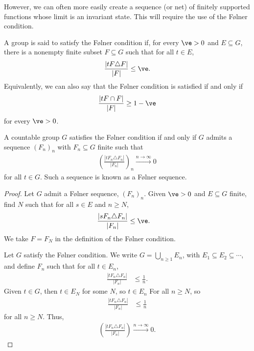 However, we can often more easily create a sequence (or net) of finitely supported functions whose limit is an invariant state. This will require the use of the Følner condition.
\begin{definition}\label{def:folner_condition}
  A group is said to satisfy the {Følner condition} if, for every $\ve > 0$ and $E\subseteq G$, there is a nonempty finite subset $F\subseteq G$ such that for all $t\in E$,
  \begin{align*}
    \frac{\left\vert tF\triangle F \right\vert}{\left\vert F \right\vert}\leq \ve.
  \end{align*}
  Equivalently, we can also say that the Følner condition is satisfied if and only if
  \begin{align*}
    \frac{\left\vert tF\cap F \right\vert}{\left\vert F \right\vert} \geq 1 - \ve
  \end{align*}
  for every $\ve > 0$.
\end{definition}
\begin{lemma}\label{lemma:folner_sequences}
  A countable group $G$ satisfies the Følner condition if and only if $G$ admits a sequence $\left(F_n\right)_n$ with $F_n\subseteq G$ finite such that
  \begin{align*}
    \left(\frac{\left\vert tF_n\triangle F_n \right\vert}{\left\vert F_n \right\vert}\right)_n \xrightarrow{n\rightarrow \infty}0
  \end{align*}
  for all $t\in G$. Such a sequence is known as a Følner sequence.
\end{lemma}
\begin{proof}
  Let $G$ admit a Følner sequence, $\left(F_n\right)_n$. Given $\ve > 0$ and $E\subseteq G$ finite, find $N$ such that for all $s\in E$ and $n\geq N$,
  \begin{align*}
    \frac{\left\vert sF_n\triangle F_n \right\vert}{\left\vert F_n \right\vert} &\leq \ve.
  \end{align*}
  We take $F = F_N$ in the definition of the Følner condition.\newline

  Let $G$ satisfy the Følner condition. We write $G = \bigcup_{n\geq 1}E_n$, with $E_1\subseteq E_2\subseteq \cdots$, and define $F_n$ such that for all $t\in E_n$,
  \begin{align*}
    \frac{\left\vert tF_n\triangle F_n \right\vert}{\left\vert F_n \right\vert} &\leq \frac{1}{n}.
  \end{align*}
  Given $t\in G$, then $t\in E_N$ for some $N$, so $t\in E_n$ For all $n\geq N$, so
  \begin{align*}
    \frac{\left\vert tF_n\triangle F_n \right\vert}{\left\vert F_n \right\vert} &\leq \frac{1}{n}
  \end{align*}
  for all $n\geq N$. Thus,
  \begin{align*}
    \left(\frac{\left\vert tF_n\triangle F_n \right\vert}{\left\vert F_n \right\vert}\right)\xrightarrow{n\rightarrow\infty}0.
  \end{align*}
\end{proof}
